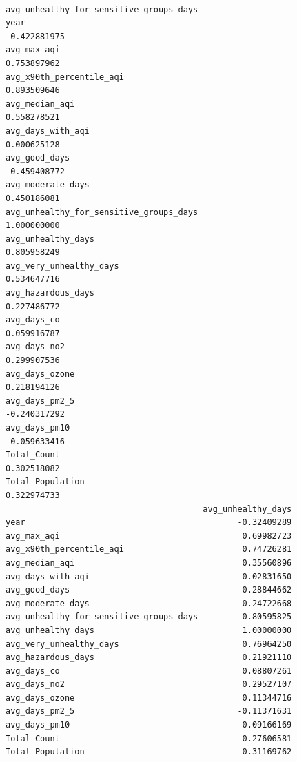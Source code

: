 \documentclass[
  12pt,
]{article}
\begin{document}
\begin{verbatim}
                                        avg_unhealthy_for_sensitive_groups_days
year                                                               -0.422881975
avg_max_aqi                                                         0.753897962
avg_x90th_percentile_aqi                                            0.893509646
avg_median_aqi                                                      0.558278521
avg_days_with_aqi                                                   0.000625128
avg_good_days                                                      -0.459408772
avg_moderate_days                                                   0.450186081
avg_unhealthy_for_sensitive_groups_days                             1.000000000
avg_unhealthy_days                                                  0.805958249
avg_very_unhealthy_days                                             0.534647716
avg_hazardous_days                                                  0.227486772
avg_days_co                                                         0.059916787
avg_days_no2                                                        0.299907536
avg_days_ozone                                                      0.218194126
avg_days_pm2_5                                                     -0.240317292
avg_days_pm10                                                      -0.059633416
Total_Count                                                         0.302518082
Total_Population                                                    0.322974733
                                        avg_unhealthy_days
year                                           -0.32409289
avg_max_aqi                                     0.69982723
avg_x90th_percentile_aqi                        0.74726281
avg_median_aqi                                  0.35560896
avg_days_with_aqi                               0.02831650
avg_good_days                                  -0.28844662
avg_moderate_days                               0.24722668
avg_unhealthy_for_sensitive_groups_days         0.80595825
avg_unhealthy_days                              1.00000000
avg_very_unhealthy_days                         0.76964250
avg_hazardous_days                              0.21921110
avg_days_co                                     0.08807261
avg_days_no2                                    0.29527107
avg_days_ozone                                  0.11344716
avg_days_pm2_5                                 -0.11371631
avg_days_pm10                                  -0.09166169
Total_Count                                     0.27606581
Total_Population                                0.31169762

\end{verbatim}
\end{document}
